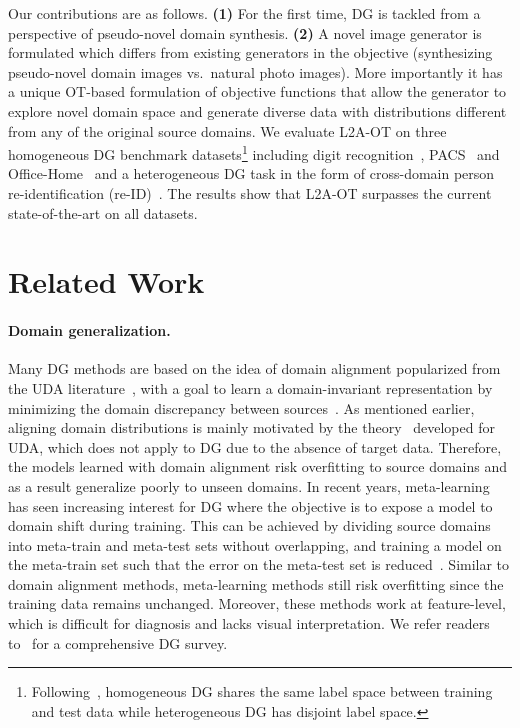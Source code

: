 \documentclass[runningheads]{llncs}
\begin{document}
Our contributions are as follows. \textbf{(1)} For the first time, DG is tackled from a perspective of pseudo-novel domain synthesis. \textbf{(2)} A novel image generator is formulated which differs from existing generators in the objective (synthesizing pseudo-novel domain images vs.~natural photo images). More importantly it has  a unique OT-based formulation of objective functions that allow the generator to explore novel domain space and generate diverse data with distributions different from any of the original source domains. We evaluate L2A-OT on three homogeneous DG benchmark datasets\footnote{Following~\cite{feature_critic}, homogeneous DG shares the same label space between training and test data while heterogeneous DG has disjoint label space.} including digit recognition~\cite{lecun1998mnist,ganin2015unsupervised,netzer2011svhn}, PACS~\cite{li2017deeper} and Office-Home~\cite{office_home} and a heterogeneous DG task in the form of cross-domain person re-identification (re-ID)~\cite{zhong2018gen,zhong2019camstyle,liu2019adaptive,zhou2019learning,jin2020style}. The results show that L2A-OT surpasses the current state-of-the-art on all datasets.

\section{Related Work} \label{sec:related_work}
\paragraph{Domain generalization.}
Many DG methods are based on the idea of domain alignment popularized from the UDA literature~\cite{ganin2015unsupervised}, with a goal to learn a domain-invariant representation by minimizing the domain discrepancy between sources~\cite{motiian2017unified,ghifary2017scatter,gan2016learning,ghifary2015domain,li2018ciddg,li2018mmdaae}. As mentioned earlier, aligning domain distributions is mainly motivated by the theory~\cite{ben2010theory} developed for UDA, which does not apply to DG due to the absence of target data. Therefore, the models learned with domain alignment risk overfitting to source domains and as a result generalize poorly to unseen domains. In recent years, meta-learning~\cite{hospedales2020meta} has seen increasing interest for DG where the objective is to expose a model to domain shift during training. This can be achieved by dividing source domains into meta-train and meta-test sets without overlapping, and training a model on the meta-train set such that the error on the meta-test set is reduced~\cite{li2018learning,balaji2018metareg,dou2019domain}. Similar to domain alignment methods, meta-learning methods still risk overfitting since the training data remains unchanged. Moreover, these methods work at feature-level, which is difficult for diagnosis and lacks visual interpretation. We refer readers to~\cite{zhou2021domain} for a comprehensive DG survey.
\end{document}
